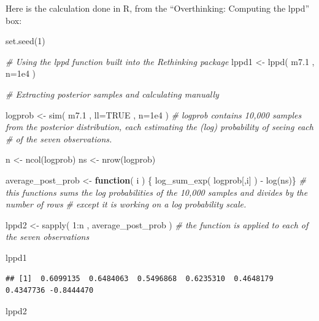 \documentclass[
]{book}
\newenvironment{Shaded}{\begin{snugshade}}{\end{snugshade}}
\newcommand{\AttributeTok}[1]{\textcolor[rgb]{0.77,0.63,0.00}{#1}}
\newcommand{\CommentTok}[1]{\textcolor[rgb]{0.56,0.35,0.01}{\textit{#1}}}
\newcommand{\ConstantTok}[1]{\textcolor[rgb]{0.00,0.00,0.00}{#1}}
\newcommand{\ControlFlowTok}[1]{\textcolor[rgb]{0.13,0.29,0.53}{\textbf{#1}}}
\newcommand{\DecValTok}[1]{\textcolor[rgb]{0.00,0.00,0.81}{#1}}
\newcommand{\FloatTok}[1]{\textcolor[rgb]{0.00,0.00,0.81}{#1}}
\newcommand{\FunctionTok}[1]{\textcolor[rgb]{0.00,0.00,0.00}{#1}}
\newcommand{\NormalTok}[1]{#1}
\newcommand{\OtherTok}[1]{\textcolor[rgb]{0.56,0.35,0.01}{#1}}
\newcommand{\SpecialCharTok}[1]{\textcolor[rgb]{0.00,0.00,0.00}{#1}}
\begin{document}
Here is the calculation done in R, from the ``Overthinking: Computing the lppd'' box:

\begin{Shaded}
\begin{Highlighting}[]
\FunctionTok{set.seed}\NormalTok{(}\DecValTok{1}\NormalTok{) }

\CommentTok{\# Using the lppd function built into the Rethinking package}
\NormalTok{lppd1 }\OtherTok{\textless{}{-}} \FunctionTok{lppd}\NormalTok{( m7}\FloatTok{.1}\NormalTok{ , }\AttributeTok{n=}\FloatTok{1e4}\NormalTok{ )}


\CommentTok{\# Extracting posterior samples and calculating manually}

\NormalTok{logprob }\OtherTok{\textless{}{-}} \FunctionTok{sim}\NormalTok{( m7}\FloatTok{.1}\NormalTok{ , }\AttributeTok{ll=}\ConstantTok{TRUE}\NormalTok{ , }\AttributeTok{n=}\FloatTok{1e4}\NormalTok{ )   }\CommentTok{\# logprob contains 10,000 samples from the posterior distribution, each estimating the (log) probability of seeing each}
                                           \CommentTok{\# of the seven observations. }

\NormalTok{n }\OtherTok{\textless{}{-}} \FunctionTok{ncol}\NormalTok{(logprob) }
\NormalTok{ns }\OtherTok{\textless{}{-}} \FunctionTok{nrow}\NormalTok{(logprob) }

\NormalTok{average\_post\_prob }\OtherTok{\textless{}{-}} \ControlFlowTok{function}\NormalTok{( i ) \{}
    \FunctionTok{log\_sum\_exp}\NormalTok{( logprob[,i] ) }\SpecialCharTok{{-}} \FunctionTok{log}\NormalTok{(ns)\}     }\CommentTok{\# this functions sums the log probabilities of the 10,000 samples and divides by the number of rows}
                                              \CommentTok{\# except it is working on a log probability scale.}

\NormalTok{lppd2 }\OtherTok{\textless{}{-}} \FunctionTok{sapply}\NormalTok{( }\DecValTok{1}\SpecialCharTok{:}\NormalTok{n , average\_post\_prob )    }\CommentTok{\# the function is applied to each of the seven observations}

\NormalTok{lppd1}
\end{Highlighting}
\end{Shaded}

\begin{verbatim}
## [1]  0.6099135  0.6484063  0.5496868  0.6235310  0.4648179  0.4347736 -0.8444470
\end{verbatim}

\begin{Shaded}
\begin{Highlighting}[]
\NormalTok{lppd2}
\end{Highlighting}
\end{Shaded}
\end{document}
